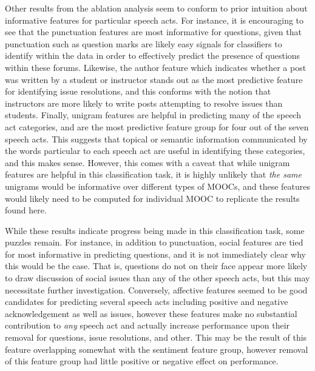 \documentclass[twoside]{article}
\begin{document}
\par
Other results from the ablation analysis seem to conform to prior intuition about informative features for particular speech acts. For instance, it is encouraging to see that the punctuation features are most informative for questions, given that punctuation such as question marks are likely easy signals for classifiers to identify within the data in order to effectively predict the presence of questions within these forums. Likewise, the author feature which indicates whether a post was written by a student or instructor stands out as the most predictive feature for identifying issue resolutions, and this conforms with the notion that instructors are more likely to write posts attempting to resolve issues than students. Finally, unigram features are helpful in predicting many of the speech act categories, and are the most predictive feature group for four out of the seven speech acts. This suggests that topical or semantic information communicated by the words particular to each speech act are useful in identifying these categories, and this makes sense. However, this comes with a caveat that while unigram features are helpful in this classification task, it is highly unlikely that \emph{the same} unigrams would be informative over different types of MOOCs, and these features would likely need to be computed for individual MOOC to replicate the results found here.
\par
While these results indicate progress being made in this classification task, some puzzles remain. For instance, in addition to punctuation, social features are tied for most informative in predicting questions, and it is not immediately clear why this would be the case. That is, questions do not on their face appear more likely to draw discussion of social issues than any of the other speech acts, but this may necessitate further investigation. Conversely, affective features seemed to be good candidates for predicting several speech acts including positive and negative acknowledgement as well as issues, however these features make no substantial contribution to \emph{any} speech act and actually increase performance upon their removal for questions, issue resolutions, and other. This may be the result of this feature overlapping somewhat with the sentiment feature group, however removal of this feature group had little positive or negative effect on performance.
\end{document}

